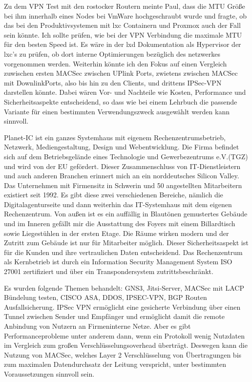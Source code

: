 \documentclass[english,runningheads,a4paper]{llncs}[2018/03/10]
\newcommand{\commentontext}[2]{\colorbox{yellow!60}{#1}\pdfcomment[color={0.234 0.867 0.211},hoffset=-6pt,voffset=10pt,opacity=0.5]{#2}}
\begin{document}
Zu dem VPN Test mit den rostocker Routern meinte Paul, dass die MTU Größe bei ihm innerhalb eines Nodes bei VmWare hochgeschraubt wurde und fragte, ob das bei den Produktivsystemen mit lxc Containern und Proxmox auch der Fall sein könnte. Ich sollte prüfen, wie bei der VPN Verbindung die maximale MTU für den besten Speed ist. Es wäre in der lxd Dokumentation als Hypervisor der lxc's zu prüfen, ob dort interne Optimierungen bezüglich des netzwerkes vorgenommen werden.
Weiterhin könnte ich den Fokus auf einen Vergleich zuwischen ersten MACSec zwischen UPlink Ports, zwietens zwischen MACSec mit DownlinkPorts, also bis hin zu den Clients, und drittens IPSec-VPN darstellen könnte. Dabei wären Vor- und Nachteile wie Kosten, Performance und Sicherheitsaspekte entscheidend, so dass wie bei einem Lehrbuch die passende Variante für einen bestimmten Verwendungszweck ausgewählt werden kann sinnvoll.

 

Planet-IC ist ein ganzes Systemhaus mit eigenem Rechenzentrumsbetrieb, Netzwerk, Mediengestaltung, Design und Webentwicklung. Die Firma befindet sich auf dem Betriebsgelände eines Technologie und Gewerbezentrums e.V.(TGZ) und wird von der \commentontext{EU gefördert}{stimmt das?}. Dieser Zusammenschluss von IT-Dienstleistern und auch anderen Branchen erinnert mich an ein norddeutsches Silicon Valley. Das Unternehmen mit Firmensitz in Schwerin und 50 angestellten Mitarbeitern existiert seit 1992. Es gibt diese zwei verschiedenen Bereiche, nämlich die Digitalagenturseite und dann weiterhin das IT-Systemhaus mit dem eigenen Rechenzentrum. 
Von außen ist es ein auffällig in Blautönen gemustertes Gebäude und im Inneren gefällt mir die Ausstattung des Foyers mit einem Billardtisch sowie Liegestühlen in der ersten Etage. Die Räume wirken modern und der Zutritt zum Gebäude ist nur für Mitarbeiter möglich. Dieser Sicherheitsaspekt ist für die Kunden und ihre vertraulichen Daten entscheidend.
Das Rechenzentrum als Kernbetrieb ist durch ein Information Security Management System ISO 27001 zertifiziert und über ein Transpondersystem zutrittsbeschränkt. 

 Es wurden folgende Themen behandelt: GNS3, Jitsi-Server, MACSec mit LACP Bündelung testen, CISCO ASA, DDOS, IPSEC-VPN, BGP Routen Ausfallsicherung.
IPSec VPN ermöglicht eine gesicherte Verbindung über einen Tunnel zwischen Sender und Empfänger und ermöglicht damit die remote Anbindung von Nutzern an Firmeninterne Netze. Aber es gibt Performanceprobleme unter anderem dann, wenn ein Protokoll wenig Nutzdaten im Vergleich zum großen Verschlüsselungsoverhead überträgt. Deswegen kann die Nutzung von MACSec, welches Layer 2 Verschlüsselung von Übertragungen bis zum maximalen Datendurchsatz der Leitung verspricht, unter bestimmten Voraussetzungen sinnvoll sein.
\end{document}
